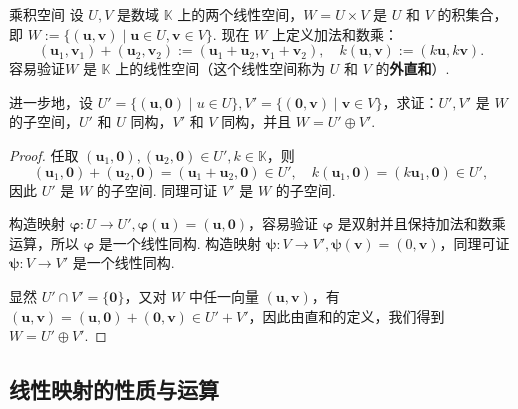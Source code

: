 \documentclass[12pt, a4paper,newtx]{ctexart}
\begin{document}
\begin{example}{乘积空间}
	设 $U, V$ 是数域 $\mathbb{K}$ 上的两个线性空间，$W = U \times V$ 是 $U$ 和 $V$ 的{\heiti 积集合}，即 $W := \{(\bm u, \bm v) \mid \bm u \in U, \bm v \in V\}$. 现在 $W$ 上定义加法和数乘：
	\[
	(\bm u_1, \bm v_1) + (\bm u_2, \bm v_2) := (\bm u_1 + \bm u_2, \bm v_1 +\bm v_2), \quad k(\bm u, \bm v) := (k\bm u, k\bm v).
	\]
	容易验证$W$ 是 $\mathbb{K}$ 上的线性空间（这个线性空间称为 $U$ 和 $V$ 的\textbf{外直和}）. 
	
	进一步地，设 $ U' = \{(\bm u, \bm 0) \mid u \in U\}, V' = \{(\bm 0, \bm{v}) \mid \bm{v} \in V\} $，求证：$ U', V' $ 是 $ W $ 的子空间，$ U' $ 和 $ U $ 同构，$ V' $ 和 $ V $ 同构，并且 $ W = U' \oplus V'. $
\end{example}
\begin{proof}
	任取 $(\bm{u}_1, \bm 0), (\bm{u}_2, \bm 0) \in U', k \in \mathbb{K}$，则 \[(\bm{u}_1, \bm 0) + (\bm{u}_2, \bm 0) = (\bm{u}_1 + \bm{u}_2, \bm 0) \in U', \quad k(\bm{u}_1, \bm 0) = (k\bm{u}_1, \bm 0) \in U',\]因此 $ U' $ 是 $ W $ 的子空间. 同理可证 $ V' $ 是 $ W $ 的子空间. 
	
	构造映射 $\bm{\varphi}: U \rightarrow U', \bm{\varphi}(\bm{u}) = (\bm{u}, \bm 0)$，容易验证 $\bm{\varphi}$ 是双射并且保持加法和数乘运算，所以 $\bm{\varphi}$ 是一个线性同构. 构造映射 $\bm{\psi}: V \rightarrow V', \bm{\psi}(\bm{v}) = (0, \bm{v})$，同理可证 $\bm{\psi}: V \rightarrow V'$ 是一个线性同构. 
	
	显然 $ U' \cap V' = \{\bm 0\} $，又对 $ W $ 中任一向量 $(\bm{u}, \bm{v})$，有 $(\bm{u}, \bm{v}) = (\bm{u}, \bm 0) + (\bm 0, \bm{v}) \in U' + V'$，因此由直和的定义，我们得到 $ W = U' \oplus V' $. 
\end{proof}
\subsection{线性映射的性质与运算}
\end{document}
